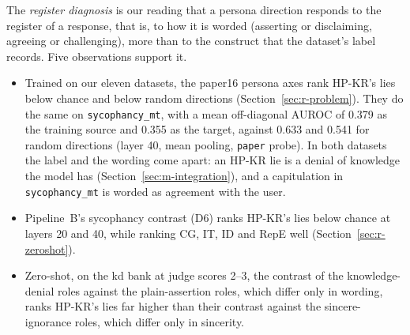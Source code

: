 The \emph{register diagnosis} is our reading that a persona direction responds to the register of a response, that is, to how it is worded (asserting or disclaiming, agreeing or challenging), more than to the construct that the dataset's label records. %
Five observations support it.
\begin{itemize}
\item Trained on our eleven datasets, the paper16 persona axes rank HP-KR's lies below chance and below random directions (Section~\ref{sec:r-problem}). %
They do the same on \texttt{sycophancy\_mt}, with a mean off-diagonal AUROC of 0.379 as the training source and 0.355 as the target, against 0.633 and 0.541 for random directions (layer 40, mean pooling, \texttt{paper} probe). %
In both datasets the label and the wording come apart: an HP-KR lie is a denial of knowledge the model has (Section~\ref{sec:m-integration}), and a capitulation in \texttt{sycophancy\_mt} is worded as agreement with the user. %
\item Pipeline~B's sycophancy contrast (D6) ranks HP-KR's lies below chance at layers 20 and 40, while ranking CG, IT, ID and RepE well (Section~\ref{sec:r-zeroshot}). %
\item Zero-shot, on the kd bank at judge scores 2--3, the contrast of the knowledge-denial roles against the plain-assertion roles, which differ only in wording, ranks HP-KR's lies far higher than their contrast against the sincere-ignorance roles, which differ only in sincerity. %

\end{itemize}
